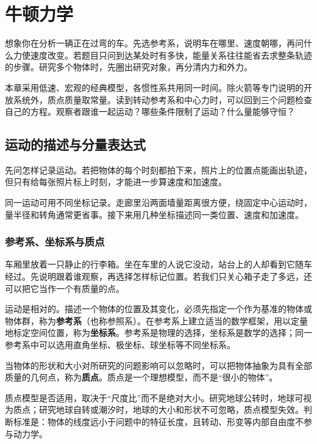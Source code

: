 \chapter{牛顿力学}\label{ch:particle}

\begin{guidebox}
想象你在分析一辆正在过弯的车。先选参考系，说明车在哪里、速度朝哪，再问什么力使速度改变。若题目只问到达某处时有多快，能量关系往往能省去求整条轨迹的步骤。研究多个物体时，先圈出研究对象，再分清内力和外力。

本章采用低速、宏观的经典模型，各惯性系共用同一时间。除火箭等专门说明的开放系统外，质点质量取常量。读到转动参考系和中心力时，可以回到三个问题检查自己的方程。观察者跟谁一起运动？哪些条件限制了运动？什么量能够守恒？
\end{guidebox}

\section{运动的描述与分量表达式}

先问怎样记录运动。若把物体的每个时刻都拍下来，照片上的位置点能画出轨迹，但只有给每张照片标上时刻，才能进一步算速度和加速度。

同一运动可用不同坐标记录。走廊里沿两面墙量距离很方便，绕固定中心运动时，量半径和转角通常更省事。接下来用几种坐标描述同一类位置、速度和加速度。

\subsection{参考系、坐标系与质点}

车厢里放着一只静止的行李箱。坐在车里的人说它没动，站台上的人却看到它随车经过。先说明跟着谁观察，再选择怎样标记位置。若我们只关心箱子走了多远，还可以把它当作一个有质量的点。

运动是相对的。描述一个物体的位置及其变化，必须先指定一个作为基准的物体或物体群，称为\textbf{参考系}（也称参照系）。在参考系上建立适当的数学框架，用以定量地标定空间位置，称为\textbf{坐标系}。参考系是物理的选择，坐标系是数学的选择；同一参考系中可以选用直角坐标、极坐标、球坐标等不同坐标系。

\begin{definition}[质点]
当物体的形状和大小对所研究的问题影响可以忽略时，可以把物体抽象为具有全部质量的几何点，称为\textbf{质点}。质点是一个理想模型，而不是“很小的物体”。
\end{definition}

\begin{physicsbox}
质点模型是否适用，取决于“尺度比”而不是绝对大小。研究地球公转时，地球可视为质点；研究地球自转或潮汐时，地球的大小和形状不可忽略，质点模型失效。判断标准是：物体的线度远小于问题中的特征长度，且转动、形变等内部自由度不参与动力学。
\end{physicsbox}

